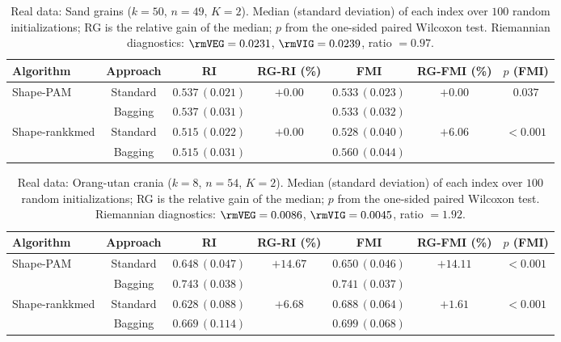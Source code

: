 \begin{table}[t]
\centering
\caption{Real data: Sand grains ($k=50$, $n=49$, $K=2$). Median (standard deviation) of each index over $100$ random initializations; RG is the relative gain of the median; $p$ from the one-sided paired Wilcoxon test. Riemannian diagnostics: $\rmVEG=0.0231$, $\rmVIG=0.0239$, ratio $=0.97$.}
\label{tab:sand}
\small
\begin{tabular}{lc cc cc c}
\toprule
Algorithm & Approach & RI & RG-RI (\%) & FMI & RG-FMI (\%) & $p$ (FMI) \\
\midrule
\multirow{2}{*}{Shape-PAM} & Standard & $0.537\,(0.021)$ & \multirow{2}{*}{$+0.00$} & $0.533\,(0.023)$ & \multirow{2}{*}{$+0.00$} & \multirow{2}{*}{$\mathbf{0.037}$} \\
 & Bagging & $0.537\,(0.031)$ & & $0.533\,(0.032)$ & & \\
\multirow{2}{*}{Shape-rankkmed} & Standard & $0.515\,(0.022)$ & \multirow{2}{*}{$+0.00$} & $0.528\,(0.040)$ & \multirow{2}{*}{$+6.06$} & \multirow{2}{*}{$\mathbf{<\!0.001}$} \\
 & Bagging & $0.515\,(0.031)$ & & $0.560\,(0.044)$ & & \\
\bottomrule
\end{tabular}
\end{table}

\begin{table}[t]
\centering
\caption{Real data: Orang-utan crania ($k=8$, $n=54$, $K=2$). Median (standard deviation) of each index over $100$ random initializations; RG is the relative gain of the median; $p$ from the one-sided paired Wilcoxon test. Riemannian diagnostics: $\rmVEG=0.0086$, $\rmVIG=0.0045$, ratio $=1.92$.}
\label{tab:orang-utan}
\small
\begin{tabular}{lc cc cc c}
\toprule
Algorithm & Approach & RI & RG-RI (\%) & FMI & RG-FMI (\%) & $p$ (FMI) \\
\midrule
\multirow{2}{*}{Shape-PAM} & Standard & $0.648\,(0.047)$ & \multirow{2}{*}{$+14.67$} & $0.650\,(0.046)$ & \multirow{2}{*}{$+14.11$} & \multirow{2}{*}{$\mathbf{<\!0.001}$} \\
 & Bagging & $0.743\,(0.038)$ & & $0.741\,(0.037)$ & & \\
\multirow{2}{*}{Shape-rankkmed} & Standard & $0.628\,(0.088)$ & \multirow{2}{*}{$+6.68$} & $0.688\,(0.064)$ & \multirow{2}{*}{$+1.61$} & \multirow{2}{*}{$\mathbf{<\!0.001}$} \\
 & Bagging & $0.669\,(0.114)$ & & $0.699\,(0.068)$ & & \\
\bottomrule
\end{tabular}
\end{table}

